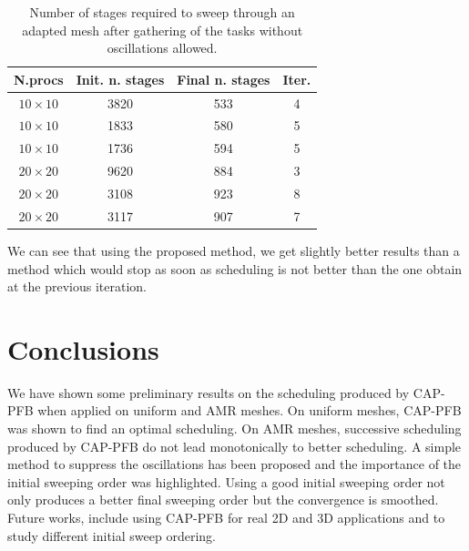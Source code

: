 \documentclass[letterpaper]{article}
\renewcommand{\(}{\left(}
\renewcommand{\)}{\right)}
\renewcommand{\[}{\left[}
\renewcommand{\]}{\right]}
\begin{document}
\begin{table}[H]
  \begin{center}
    \begin{tabular}{|c|c|c|c|}
      \hline
      N.procs & Init. n. stages & Final n. stages & Iter. \\
      \hline
      $10 \times 10$ & 3820 & 533 & 4 \\
      $10 \times 10$ & 1833 & 580 & 5 \\
      $10 \times 10$ & 1736 & 594 & 5 \\
      $20 \times 20$ & 9620 & 884 & 3 \\
      $20 \times 20$ & 3108 & 923 & 8 \\
      $20 \times 20$ & 3117 & 907 & 7 \\
      \hline
    \end{tabular}
    \caption{Number of stages required to sweep through an adapted mesh after
    gathering of the tasks without oscillations allowed.}
    \label{band_3}
  \end{center}
\end{table}

We can see that using the proposed method, we get slightly better results than a
method which would stop as soon as scheduling is not better than the one obtain
at the previous iteration.

\section{Conclusions} \label{conclusions}
We have shown some preliminary results on the scheduling produced by CAP-PFB
when applied on uniform and AMR meshes. On uniform meshes, CAP-PFB was shown to
find an optimal scheduling. On AMR meshes, successive scheduling produced by
CAP-PFB do not lead monotonically to better scheduling. A simple method to
suppress the oscillations has been proposed and the importance of the initial
sweeping order was highlighted. Using a good initial sweeping order not only
produces a better final sweeping order but the convergence is smoothed. Future
works, include using CAP-PFB for real 2D and 3D applications and to study
different initial sweep ordering.




\end{document}
